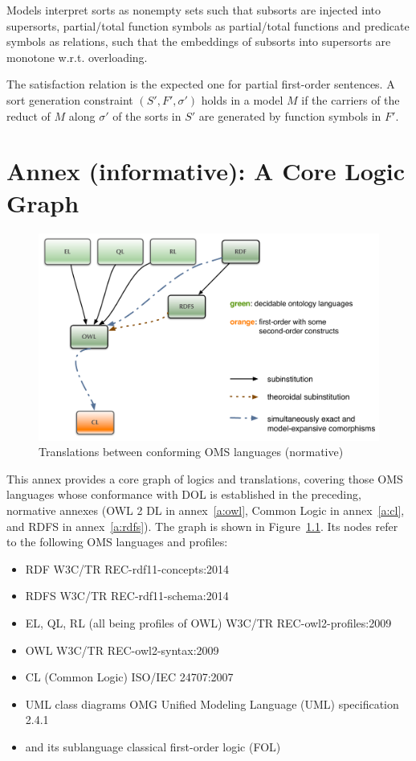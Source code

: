 \documentclass[10pt,fleqn,%
\ifpretendfinal
final%
\else
draft%
\fi,
]{scrreprt}
\newcommand{\annexrefname}{annex}
\newcommand{\figurerefname}{Figure}
\newcommand{\aref}[1]{\annexrefname~\ref{#1}}
\newcommand{\fref}[1]{\figurerefname~\ref{#1}}
\newcommand{\nisref}[1]{#1}
\newcommand{\infannex}[1]{ \chapter{Annex (informative): #1} }
\begin{document}
Models interpret sorts as nonempty sets such that subsorts are injected into supersorts,
partial/total function symbols as partial/total functions and 
predicate symbols as relations,
 such that the embeddings of subsorts into
supersorts are monotone w.r.t. overloading.

The satisfaction relation is the expected one for partial first-order sentences. A sort generation
constraint $(S', F', \sigma')$ holds in a model $M$ if the carriers of the reduct of $M$ along $\sigma'$ 
of the sorts in $S'$ are generated by function symbols in $F'$.

\infannex{A Core Logic Graph}\label{a:graph}


\begin{figure}
  \centering
  \includegraphics[width=\textwidth]{illustrations/ontograph-standards}
  \caption{Translations between conforming OMS languages (normative)}
  \label{fig:ontograph-standards}
\end{figure}
This annex provides a core graph of logics and translations, covering those OMS languages whose conformance with DOL is established in the preceding, normative annexes (OWL 2 DL in \aref{a:owl}, Common Logic in \aref{a:cl}, and RDFS in \aref{a:rdfs}).  The graph is shown in \fref{fig:ontograph-standards}.  Its nodes refer to the following OMS languages and profiles:
\begin{itemize}
\item RDF \nisref{W3C/TR REC-rdf11-concepts:2014}
\item RDFS \nisref{W3C/TR REC-rdf11-schema:2014}
\item EL, QL, RL (all being profiles of OWL) \nisref{W3C/TR REC-owl2-profiles:2009}
\item OWL \nisref{W3C/TR REC-owl2-syntax:2009}
\item CL (Common Logic) \nisref{ISO/IEC 24707:2007}
\item UML class diagrams \nisref{OMG Unified Modeling Language (UML) specification 2.4.1}
\item \CASL \cite{CASL-RM} and its sublanguage classical first-order logic (FOL)
\end{itemize}
\end{document}
